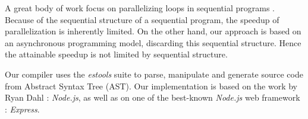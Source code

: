 A great body of work focus on parallelizing loops in sequential programs \cite{Banerjee2013}. %
Because of the sequential structure of a sequential program, the speedup of parallelization is inherently limited.
On the other hand, our approach is based on an asynchronous programming model, discarding this sequential structure.
Hence the attainable speedup is not limited by sequential structure.



Our compiler uses the \textit{estools} suite to parse, manipulate and generate source code from Abstract Syntax Tree (AST).
Our implementation is based on the work by Ryan Dahl : \textit{Node.js}, as well as on one of the best-known \textit{Node.js} web framework : \textit{Express}.